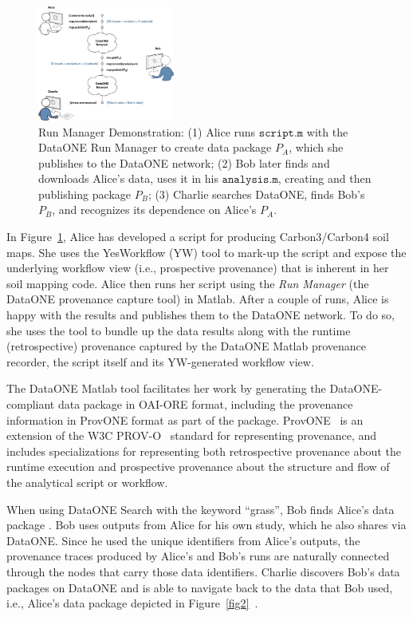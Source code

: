 \documentclass[a4paper]{llncs}
\newcommand{\mytt}[1]{\ensuremath{\mathtt{#1}}}
\begin{document}
\begin{figure}[t] \centering \includegraphics[width=0.4\textwidth]{figs/alice-bob-charlie-sequence-crop} \caption{Run Manager Demonstration: (1) Alice runs \mytt{script.m} with the DataONE Run Manager to create data package $P_A$, which she publishes to the DataONE network; (2) Bob later finds and downloads Alice's data, uses it in his \mytt{analysis.m}, creating and then publishing package $P_B$; (3) Charlie searches DataONE, finds Bob's $P_B$, and recognizes its dependence on Alice's $P_A$.}  \label{fig0} \end{figure}

In Figure~\ref{fig0}, Alice has developed a script for producing Carbon3/Carbon4 soil maps.  She uses the YesWorkflow (YW) tool to mark-up the script and expose the underlying workflow view (i.e., prospective provenance) that is inherent in her soil mapping code. Alice then runs her script using the \emph{Run Manager} (the DataONE provenance capture tool) in Matlab. After a couple of runs, Alice is happy with the results and publishes them to the DataONE network. To do so, she uses the tool to bundle up the data results along with the runtime (retrospective) provenance captured by the DataONE Matlab provenance recorder, the script itself and its YW-generated workflow view.

The DataONE Matlab tool facilitates her work by generating the DataONE-compliant data package in OAI-ORE format, including the provenance information in ProvONE format as part of the package. ProvONE~\cite{provone} is an extension of the W3C PROV-O~\cite{prov-o} standard for representing provenance, and includes specializations for representing both retrospective provenance about the runtime execution and prospective provenance about the structure and flow of the analytical script or workflow.


When using DataONE Search with the keyword ``grass'', Bob finds Alice's data package \cite{yaxing}. Bob uses outputs from Alice for his own study, which he also shares via DataONE. Since he used the unique identifiers from Alice's outputs, the provenance traces produced by Alice's and Bob's runs are naturally connected through the nodes that carry those data identifiers. Charlie discovers Bob's data packages on DataONE and is able to navigate back to the data that Bob used, i.e., Alice's data package depicted in Figure~\ref{fig2}~\cite{Katz,data-trajectories}.
\end{document}
